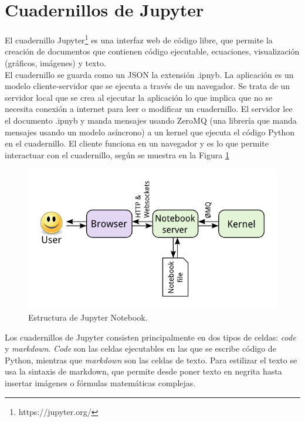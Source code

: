\section{Cuadernillos de Jupyter}

El cuadernillo Jupyter\footnote{https://jupyter.org/} es una interfaz web de código libre, que permite la creación de documentos que contienen código ejecutable, ecuaciones, visualización (gráficos, imágenes) y texto.\\

El cuadernillo se guarda como un JSON la extensión .ipnyb. La aplicación es un modelo cliente-servidor que se ejecuta a través de un navegador. Se trata de un servidor local que se crea al ejecutar la aplicación lo que implica que no se necesita conexión a internet para leer o modificar un cuadernillo.  El servidor lee el documento .ipnyb y manda mensajes usando ZeroMQ (una librería que manda mensajes usando un modelo asíncrono) a un kernel que ejecuta el código Python en el cuadernillo. El cliente funciona en un navegador y es lo que permite interactuar con el cuadernillo, según se muestra en la Figura \ref{estructurajupyter}

\begin{figure}[h]
\centering
\includegraphics[width=1.0\textwidth]{imagenes/estructurajupyter}
\caption{Estructura de Jupyter Notebook.}
\label{estructurajupyter}
\end{figure}

Los cuadernillos de Jupyter consisten principalmente en dos tipos de celdas: \emph{code} y \emph{markdown}.\emph{ Code }son las celdas ejecutables en las que se escribe código de Python, mientras que \emph{markdown} son las celdas de texto. Para estilizar el texto se usa  la sintaxis de markdown, que permite desde poner texto en negrita hasta insertar imágenes o fórmulas matemáticas complejas.\\

